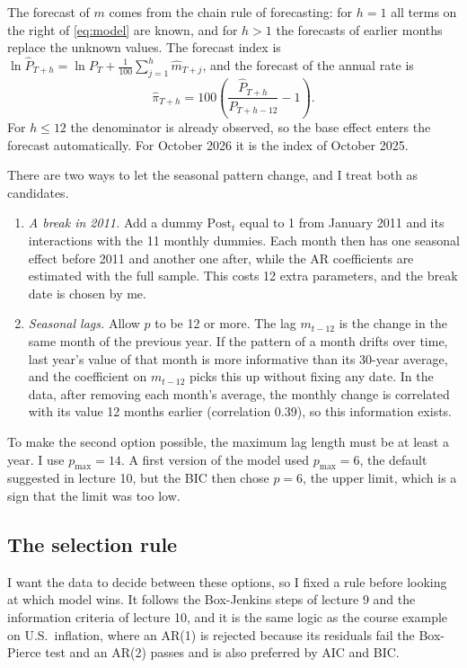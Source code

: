 \documentclass[11pt]{article}
\begin{document}
The forecast of $m$ comes from the chain rule of forecasting: for $h=1$ all terms on the right of \eqref{eq:model} are known, and for $h>1$ the forecasts of earlier months replace the unknown values. The forecast index is $\ln\hat P_{T+h} = \ln P_T + \frac{1}{100}\sum_{j=1}^{h}\hat m_{T+j}$, and the forecast of the annual rate is
\begin{equation}
\hat\pi_{T+h} = 100\left(\frac{\hat P_{T+h}}{P_{T+h-12}}-1\right).
\label{eq:rebuild}
\end{equation}
For $h\le12$ the denominator is already observed, so the base effect enters the forecast automatically. For October 2026 it is the index of October 2025.

There are two ways to let the seasonal pattern change, and I treat both as candidates.
\begin{enumerate}
\item \emph{A break in 2011.} Add a dummy $\text{Post}_t$ equal to 1 from January 2011 and its interactions with the 11 monthly dummies. Each month then has one seasonal effect before 2011 and another one after, while the AR coefficients are estimated with the full sample. This costs 12 extra parameters, and the break date is chosen by me.
\item \emph{Seasonal lags.} Allow $p$ to be 12 or more. The lag $m_{t-12}$ is the change in the same month of the previous year. If the pattern of a month drifts over time, last year's value of that month is more informative than its 30-year average, and the coefficient on $m_{t-12}$ picks this up without fixing any date. In the data, after removing each month's average, the monthly change is correlated with its value 12 months earlier (correlation 0.39), so this information exists.
\end{enumerate}
To make the second option possible, the maximum lag length must be at least a year. I use $p_{\max}=14$. A first version of the model used $p_{\max}=6$, the default suggested in lecture 10, but the BIC then chose $p=6$, the upper limit, which is a sign that the limit was too low.

\subsection{The selection rule}

I want the data to decide between these options, so I fixed a rule before looking at which model wins. It follows the Box-Jenkins steps of lecture 9 and the information criteria of lecture 10, and it is the same logic as the course example on U.S.\ inflation, where an AR(1) is rejected because its residuals fail the Box-Pierce test and an AR(2) passes and is also preferred by AIC and BIC.
\end{document}
